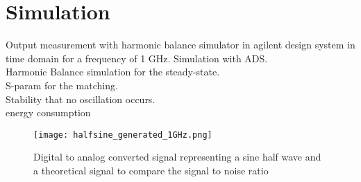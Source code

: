 \chapter{Simulation}
Output measurement with harmonic balance simulator in agilent design system in time domain for a frequency of 1 GHz.
Simulation  with ADS. \\Harmonic Balance simulation for the steady-state.\\ S-param for the matching.\\ Stability that no oscillation occurs. \\ energy consumption\\

\begin{figure}[ht]
	\centering
  \texttt{[image: halfsine\_generated\_1GHz.png]}
	\caption{Digital to analog converted signal representing a sine half wave and a theoretical signal to compare the signal to noise ratio}
	\label{halfsine}
\end{figure}